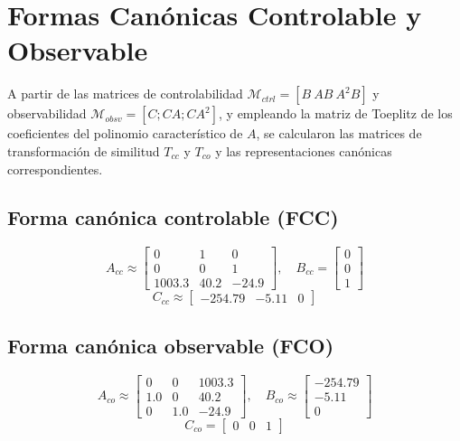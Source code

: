 \documentclass[conference]{IEEEtran}
\begin{document}
\section{Formas Canónicas Controlable y Observable}

A partir de las matrices de controlabilidad $\mathcal{M}_{ctrl}=[B\ AB\ A^2B]$ y observabilidad $\mathcal{M}_{obsv}=[C;CA;CA^2]$, y empleando la matriz de Toeplitz de los coeficientes del polinomio característico de $A$, se calcularon las matrices de transformación de similitud $T_{cc}$ y $T_{co}$ y las representaciones canónicas correspondientes.

\subsection{Forma canónica controlable (FCC)}
\begin{equation}
A_{cc} \approx \begin{bmatrix} 0 & 1 & 0 \\ 0 & 0 & 1 \\ 1003.3 & 40.2 & -24.9 \end{bmatrix},\quad
B_{cc} = \begin{bmatrix} 0 \\ 0 \\ 1 \end{bmatrix}
\end{equation}
\begin{equation}
C_{cc} \approx \begin{bmatrix} -254.79 & -5.11 & 0 \end{bmatrix}
\end{equation}

\subsection{Forma canónica observable (FCO)}
\begin{equation}
A_{co} \approx \begin{bmatrix} 0 & 0 & 1003.3 \\ 1.0 & 0 & 40.2 \\ 0 & 1.0 & -24.9 \end{bmatrix},\quad
B_{co} \approx \begin{bmatrix} -254.79 \\ -5.11 \\ 0 \end{bmatrix}
\end{equation}
\begin{equation}
C_{co} = \begin{bmatrix} 0 & 0 & 1 \end{bmatrix}
\end{equation}
\end{document}
